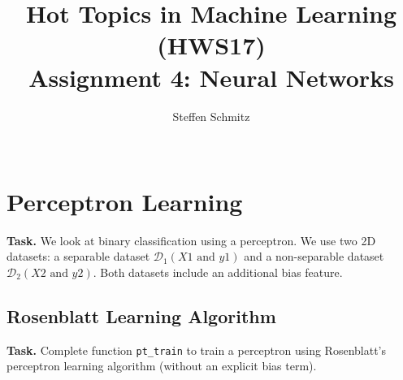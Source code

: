 \documentclass{support/acm_proc_article-sp}
\begin{document}
    \title{Hot Topics in Machine Learning (HWS17) \\ Assignment 4: Neural Networks}

    \author{
    \alignauthor
    Steffen Schmitz\\
    \\
    }

    \maketitle


    \section{Perceptron Learning}

    \textbf{Task.} We look at binary classification using a perceptron.
    We use two 2D datasets: a separable dataset $\mathcal{D}_1 (X1 \mbox{ and } y1)$ and a non-separable dataset $\mathcal{D}_2 (X2 \mbox{ and } y2)$.
    Both datasets include an additional bias feature.


    \subsection{Rosenblatt Learning Algorithm}

    \textbf{Task.} Complete function \lstinline{pt_train} to train a perceptron using Rosenblatt's perceptron learning
    algorithm (without an explicit bias term).


    
    
\end{document}
